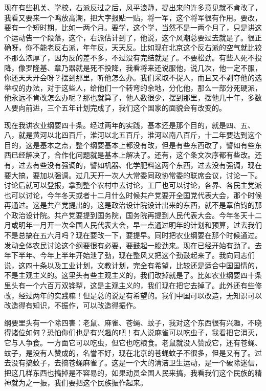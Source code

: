 现在有些机关、学校，右派反过之后，风平浪静，提出来的许多意见就不肯改了，我看又要来一个鸣放高潮，把大字报贴一贴，将一军，这个将军很有作用。要改，要有一个短时期，比如一两个月。要学，这个学，当然不是一两个月了，只是讲这个运动告一个段落，这个，右派估计到了，他说，这个风潮总要过去就是了。很正确呀，你不能老反右派，年年反，天天反。比如现在北京这个反右派的空气就比铰不那么浓厚了，因为反的差不多，不过没有完结就是了。不要松劲。有些人死不投降，像罗隆基、章乃器就是死不投降，我看将来还说服他，说几次，他一定不服，你还天天开会呀？摆到那里，听他怎么办。我们采取不捉人，而且又不剥夺他的选举权的办法，对于这些人，给他们一个转弯的余地，分化他，那么一部分死硬派，他永远不肯改怎么办呢？那也就算了，他人数很少，摆到那里，摆他几十年，多数人要向前进，三个五年计划完成了，我们这个国家的面貌会有改变的。

现在我讲农业纲要四十条。经过两年的实践，基本还是那个目的，就是四、五、八，就是黄河以北四百斤，淮河以北五百斤，淮河以南八百斤，十二年要达到这个目的，这是基本之点，整个纲要基本上都没有改，但是有些东西改了，譬如有些东西已经解决了，合作化问题就是基本上解决了。还有，这个条文次序都有些改。还有，过去有些没有强调的，譬如机器、化学肥料这两个东西，过去没有强调，现在要大搞，要加以强调。过几天开一次人大常委同政协常委的联席会议，讨论一下。讨论后就可以登报，拿到整个农村中去讨论，工厂也可以讨论，各界、各民主党派也可以讨论，今年冬天或者十二月什么时候共产党要开全国党代表大会，那个时候再通过。这是共产党提出的，这是政治设计院设计出来的东西，就不是章伯钧的那个政治设计院。共产党要提到国务院，国务院再提到人民代表大会。今年冬天十二月或明年一月开一次全国人民代表大会，早一点通过明年的计划和预算，过去我们不是总搞在五六月吗？现在要改一下，要提早。同时把农业纲要在那个时候通过。发动全体农民讨论这个纲要很有必要，要鼓起一股劲来。现在已经开始有劲了。去年下半年、今年上半年开始泄了劲，现在整风又把这个劲鼓起来了。我向同志们说，这四十条以及工业计划，文教计划，完全有希望，比较还是适合中国国情的，不是主观主义的。这里头有些主观主义的，我们改掉就是了。比如农业纲要四十条里头有一个六百万双铧犁，这是主观主义的，我们现在把它去掉了。此外还有些修改，经过两年的实践嘛！但是总的说是有希望的。我们中国可以改造，无知识可以改造得有知识，不振作，可以改造得振作。

纲要里头有一个除四害：老鼠、麻雀、苍蝇、蚊子，我对这个东西很有兴趣，不晓得诸位如何？恐怕你们也是有兴趣的吧！有人说麻雀可以吃虫子，我看把它消灭，它与人争食。一方面它可以吃虫，但它也吃粮食。老鼠就没人赞成它，还有苍蝇、蚊子，是没有人赞成的，名誉不好，现在北京的苍蝇蚊子不很多，但是又有了。过去没有搞蚊子，去搞苍蝇麻雀了。这是一个大的清洁卫生运动，是一个破除迷信，把这几样东西也搞掉是不容易的，如果动员全国人民来搞，我看我们这个民族的精神就为之一振，我们要把这个民族振作起来。

